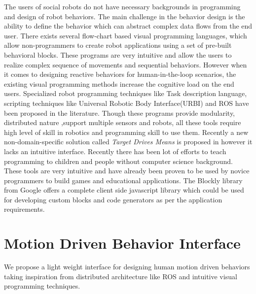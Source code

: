 \documentclass{llncs}
\begin{document}
	The users of social robots do not have necessary backgrounds in programming and design of robot behaviors. The main challenge in the behavior design is the ability to define the behavior which can abstract complex data flows from the end user. There exists several flow-chart based visual programming languages\cite{MSRS4},\cite{Choregraphe} which allow non-programmers to create robot applications using a set of pre-built behavioral blocks. These programs are very intuitive and allow the users to realize complex sequence of movements and sequential behaviors. However when it comes to designing reactive behaviors for human-in-the-loop scenarios, the existing visual programming methods increase the cognitive load on the end users. Specialized robot programming techniques like Task description language\cite{Simmons724883}, scripting techniques like Universal Robotic Body Interface(URBI)\cite{Baillie4814281} and ROS\cite{quigley2009ros} have been proposed in the literature. Though these programs provide modularity, distributed nature ,support multiple sensors and robots, all these tools require high level of skill in robotics and programming skill to use them. Recently a new non-domain-specific solution called \emph{Target Drives Means} is proposed in \cite{BerenzTDM2014} however it lacks an intuitive interface.
	Recently there has been lot of efforts to teach programming to children and people without computer science background\cite{Scratch}\cite{TouchDevelop}\cite{Blockly}. These tools are very intuitive and have already been proven to be used by novice programmers to build games and educational applications. The Blockly library\cite{Blockly} from Google offers a complete client side javascript library which could be used for developing custom blocks and code generators as per the application requirements.
\section{Motion Driven Behavior Interface}
%
We propose a light weight interface for designing human motion driven behaviors taking inspiration from distributed architecture like ROS\cite{quigley2009ros} and intuitive visual programming techniques\cite{Blockly}. 
%
\end{document}
